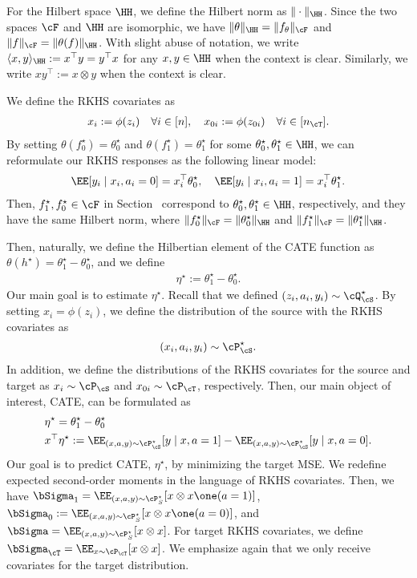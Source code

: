 \documentclass[12pt,a4paper,pdftex,onepage]{article}
\newcommand{\Sigmatreated}{\bSigma_{1}}
\newcommand{\Sigmacontrol}{\bSigma_{0}}
\begin{document}
For the Hilbert space \( \HH \), we define the Hilbert norm as \( \| \cdot \|_{\HH} \).  
Since the two spaces \( \cF \) and \( \HH \) are isomorphic, we have \( \| \theta \|_\HH = \| f_\theta \|_\cF \) and \( \| f \|_\cF = \| \theta(f) \|_\HH \).  
With slight abuse of notation, we write \( \langle x, y \rangle_{\HH} := x^\top y = y^\top x \) for any \( x, y \in \HH \) when the context is clear.  
Similarly, we write \( xy^\top := x \otimes y \) when the context is clear.  

We define the RKHS covariates as
\begin{align*}
x_i := \phi(z_i) \quad \forall i \in [n], \quad x_{0i} := \phi(z_{0i}) \quad \forall i \in [n_\cT].
\end{align*}
By setting $\theta(f_0^\star) = \theta_0^\star$ and $\theta(f_1^\star) = \theta_1^\star$ for some $\theta_0^\star, \theta_1^\star \in \HH$, we can reformulate our RKHS responses as the following linear model:
\begin{align*}
\EE[y_i \mid x_i,a_i=0] = x_i^\top \theta^\star_0, \quad \EE[y_i \mid x_i,a_i=1] = x_i^\top \theta^\star_1.
\end{align*}
Then, \(f_1^\star, f_0^\star \in \cF\) in Section~ correspond to \(\theta_0^\star, \theta_1^\star \in \HH\), respectively, and they have the same Hilbert norm, where $\|f_0^\star \|_\cF = \| \theta_0^\star \|_\HH$ and $\|f_1^\star\|_\cF = \| \theta_1^\star \|_\HH$.

Then, naturally, we define the Hilbertian element of the CATE function as $\theta(h^\star) = \theta_1^\star - \theta_0^\star$, and we define 
\begin{align*}
\eta^\star := \theta_1^\star - \theta_0^\star.
\end{align*}
Our main goal is to estimate $\eta^\star$.
Recall that we defined $(z_i,a_i,y_i) \sim \cQ^\star_\cS$. 
By setting $x_i = \phi(z_i)$, we define the distribution of the source with the RKHS covariates as 
\begin{align*}
(x_i,a_i,y_i) \sim \cP^\star_\cS.
\end{align*}
In addition, we define the distributions of the RKHS covariates for the source and target as $x_i \sim \cP_\cS$ and \(x_{0i} \sim \cP_{\cT}\), respectively.
Then, our main object of interest, CATE, can be formulated as 
\begin{align*}
&\eta^\star = \theta^\star_1 - \theta_0^\star \\
&x^\top \eta^\star :=\EE_{(x,a,y)\sim \cP_\cS^\star} [y \mid x, a=1] - \EE_{(x,a,y)\sim \cP_\cS^\star} [y \mid x, a=0].
\end{align*}
Our goal is to predict CATE, $\eta^\star$, by minimizing the target MSE.
We redefine expected second-order moments in the language of RKHS covariates. 
Then, we have $\Sigmatreated= \EE_{(x,a,y) \sim \cP^\star_S}[x \otimes x \one(a=1)]$, $\Sigmacontrol := \EE_{(x,a,y) \sim \cP^\star_S}[x \otimes x \one(a=0)]$, and $\bSigma = \EE_{(x,a,y) \sim \cP^\star_S}[x \otimes x]$.
For target RKHS covariates, we define \( \bSigma_\cT = \EE_{x \sim \cP_\cT} [x \otimes x] \).
We emphasize again that we only receive covariates for the target distribution.
\end{document}
